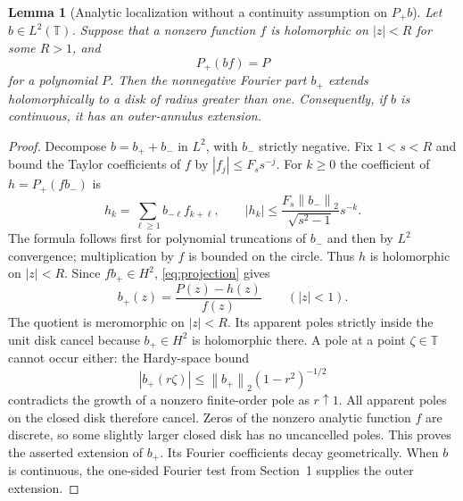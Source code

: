 \documentclass[11pt]{article}
\newtheorem{lemma}[theorem]{Lemma}
\theoremstyle{definition}
\newcommand{\T}{\mathbb T}
\newcommand{\norm}[1]{\left\lVert #1\right\rVert}
\begin{document}
\begin{lemma}[Analytic localization without a continuity assumption on $P_+b$]\label{lem:localization}
Let $b\in L^2(\T)$. Suppose that a nonzero function $f$ is holomorphic on $|z|<R$ for some $R>1$, and
\begin{equation}
 P_+(bf)=P
 \label{eq:projection}
\end{equation}
for a polynomial $P$. Then the nonnegative Fourier part $b_+$ extends holomorphically to a disk of radius greater than one. Consequently, if $b$ is continuous, it has an outer-annulus extension.
\end{lemma}
\begin{proof}
Decompose $b=b_++b_-$ in $L^2$, with $b_-$ strictly negative. Fix $1<s<R$ and bound the Taylor coefficients of $f$ by $|f_j|\le F_s s^{-j}$. For $k\ge0$ the coefficient of $h=P_+(fb_-)$ is
\[
 h_k=\sum_{\ell\ge1}b_{-\ell}f_{k+\ell},\qquad
 |h_k|\le \frac{F_s\norm{b_-}_2}{\sqrt{s^2-1}}s^{-k}.
\]
The formula follows first for polynomial truncations of $b_-$ and then by $L^2$ convergence; multiplication by $f$ is bounded on the circle. Thus $h$ is holomorphic on $|z|<R$. Since $fb_+\in H^2$, \eqref{eq:projection} gives
\begin{equation}
 b_+(z)=\frac{P(z)-h(z)}{f(z)}\qquad(|z|<1).
 \label{eq:quotient}
\end{equation}
The quotient is meromorphic on $|z|<R$. Its apparent poles strictly inside the unit disk cancel because $b_+\in H^2$ is holomorphic there. A pole at a point $\zeta\in\T$ cannot occur either: the Hardy-space bound
\[
 |b_+(r\zeta)|\le \norm{b_+}_2(1-r^2)^{-1/2}
\]
contradicts the growth of a nonzero finite-order pole as $r\uparrow1$. All apparent poles on the closed disk therefore cancel. Zeros of the nonzero analytic function $f$ are discrete, so some slightly larger closed disk has no uncancelled poles. This proves the asserted extension of $b_+$. Its Fourier coefficients decay geometrically. When $b$ is continuous, the one-sided Fourier test from Section~1 supplies the outer extension.
\end{proof}
\end{document}
